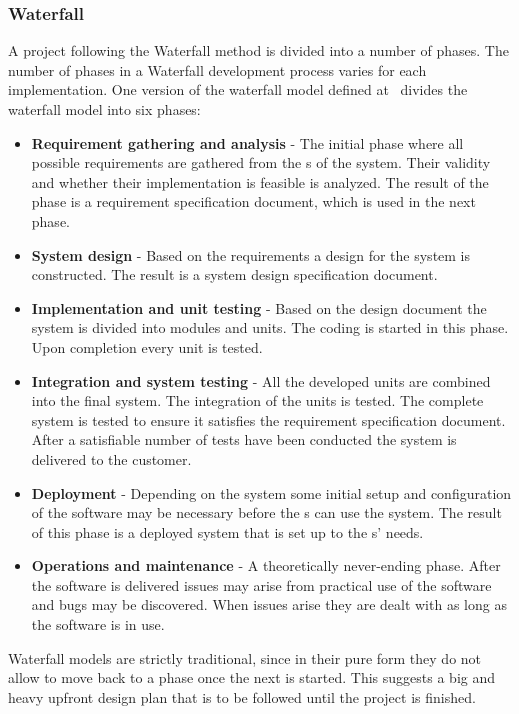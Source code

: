 \subsubsection{Waterfall}
A project following the Waterfall method is divided into a number of phases.
The number of phases in a Waterfall development process varies for each implementation.
One version of the waterfall model defined at~\cite{Parekh11} divides the waterfall model into six phases:

\begin{itemize}
	\item \textbf{Requirement gathering and analysis} - The initial phase where all possible requirements are gathered from the \euser{}s of the system.
	Their validity and whether their implementation is feasible is analyzed.
	The result of the phase is a requirement specification document, which is used in the next phase.
	\item \textbf{System design} - Based on the requirements a design for the system is constructed. 
	The result is a system design specification document.
	\item \textbf{Implementation and unit testing} - Based on the design document the system is divided into modules and units. 
	The coding is started in this phase. 
	Upon completion every unit is tested.
	\item \textbf{Integration and system testing} - All the developed units are combined into the final system. 
	The integration of the units is tested.
	The complete system is tested to ensure it satisfies the requirement specification document.
	After a satisfiable number of tests have been conducted the system is delivered to the customer.
	\item \textbf{Deployment} - Depending on the system some initial setup and configuration of the software may be necessary before the \euser{}s can use the system. 
	The result of this phase is a deployed system that is set up to the \euser{}s' needs.
	\item \textbf{Operations and maintenance} - A theoretically never-ending phase. 
	After the software is delivered issues may arise from practical use of the software and bugs may be discovered. 
	When issues arise they are dealt with as long as the software is in use.
\end{itemize}

Waterfall models are strictly traditional, since in their pure form they do not allow to move back to a phase once the next is started.
This suggests a big and heavy upfront design plan that is to be followed until the project is finished.


